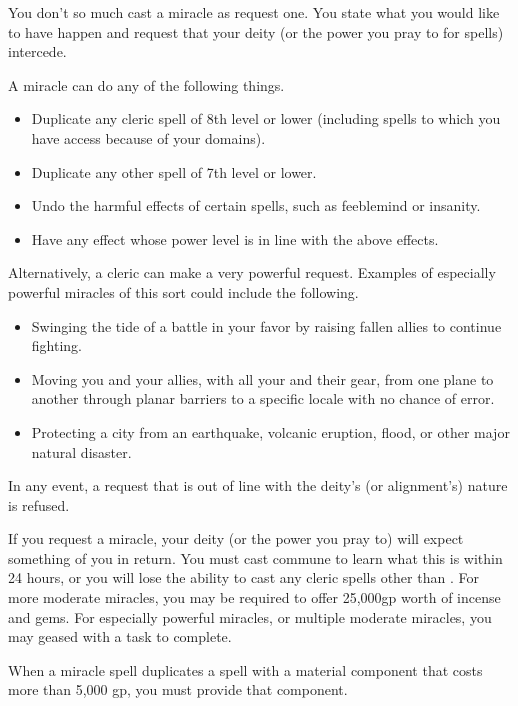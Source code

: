 \begin{spellheader}
\end{spellheader}
\begin{spelleffects}
    \spelleffect You don't so much cast a miracle as request one. You state what you would like to have happen and request that your deity (or the power you pray to for spells) intercede.
    \par A miracle can do any of the following things.
    \begin{itemize}
        \item Duplicate any cleric spell of 8th level or lower (including spells to which you have access because of your domains). 
        \item Duplicate any other spell of 7th level or lower.
        \item Undo the harmful effects of certain spells, such as feeblemind or insanity.
        \item Have any effect whose power level is in line with the above effects.
    \end{itemize}
    \par Alternatively, a cleric can make a very powerful request. Examples of especially powerful miracles of this sort could include the following.
    \begin{itemize}
        \item Swinging the tide of a battle in your favor by raising fallen allies to continue fighting.
        \item Moving you and your allies, with all your and their gear, from one plane to another through planar barriers to a specific locale with no chance of error.
        \item Protecting a city from an earthquake, volcanic eruption, flood, or other major natural disaster.
    \end{itemize}
    \par In any event, a request that is out of line with the deity's (or alignment's) nature is refused.
\end{spelleffects}
\begin{spellfooter}
    \spellnotes If you request a miracle, your deity (or the power you pray to) will expect something of you in return. You must cast commune to learn what this is within 24 hours, or you will lose the ability to cast any cleric spells other than . For more moderate miracles, you may be required to offer 25,000gp worth of incense and gems. For especially powerful miracles, or multiple moderate miracles, you may geased with a task to complete.
    \par When a miracle spell duplicates a spell with a material component that costs more than 5,000 gp, you must provide that component.
\end{spellfooter}

